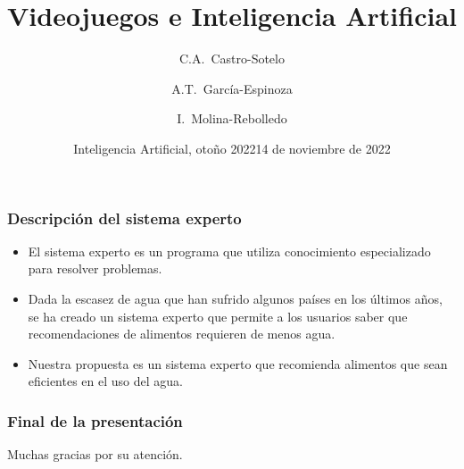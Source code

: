 \documentclass[aspectratio=169]{beamer}
\title{Videojuegos e Inteligencia Artificial}
\author[Castro-Sotelo, García-Espinoza, Molina-Rebolledo] %
{C.A.~Castro-Sotelo \and A.T.~García-Espinoza \and I.~Molina-Rebolledo}
\institute[BUAP] %
{
  Facultad de Ciencias de la Computación\\
  Benemérita Universidad Autónoma de Puebla
}
\date[Otoño 2022] %
{Inteligencia Artificial, otoño 2022}
\date{14 de noviembre de 2022}
\begin{document}
\frame{\titlepage}


\begin{frame}
\frametitle{Descripción del sistema experto}

\begin{itemize}[<+->]
\item El sistema experto es un programa que utiliza conocimiento especializado para resolver problemas.
\item Dada la escasez de agua que han sufrido algunos países en los últimos años, se ha creado un sistema experto que permite a los usuarios saber que recomendaciones de alimentos requieren de menos agua.
\item Nuestra propuesta es un sistema experto que recomienda alimentos que sean eficientes en el uso del agua.
\end{itemize}
\end{frame}



\begin{frame}
\frametitle{Final de la presentación}

Muchas gracias por su atención.
\end{frame}
\end{document}
